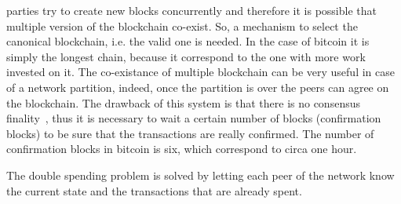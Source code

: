 parties try to create new blocks concurrently and therefore it is possible that 
multiple version of the blockchain co-exist. So, a mechanism to select the 
canonical blockchain, i.e. the valid one is needed. In the case of bitcoin
it is simply the longest chain, because it correspond to the one with more work
invested on it. The co-existance of multiple blockchain can be very useful
in case of a network partition, indeed, once the partition is over the 
peers can agree on the blockchain. The drawback of this system is that
there is no consensus finality~\cite{bib:the-quest}, thus it is necessary to
wait a certain number of blocks (confirmation blocks) to be sure that the 
transactions are really confirmed. The number of confirmation blocks in bitcoin
is six, which correspond to circa one hour.

The double spending problem is solved by letting each peer of the network
know the current state and the transactions that are already spent.











